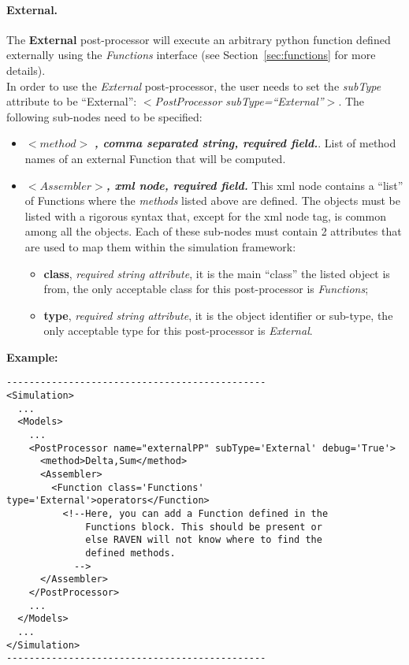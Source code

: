 \paragraph{External.}
\label{External}
The \textbf{External} post-processor will execute an arbitrary python function
defined externally using the \textit{Functions} interface (see 
Section~\ref{sec:functions} for more details).
\\In order to use the \textit{External} post-processor, the user needs to set 
the \textit{subType} attribute to be ``External'': 
\textit{$<$PostProcessor subType=``External''$>$}. 
The following sub-nodes need to be specified:
\begin{itemize}
\item $<method>$ \textbf{\textit{, comma separated string, required field.}}.
List of method names of an external Function that will be computed.
\item $<Assembler>$\textbf{\textit{, xml node, required field.}} This xml node
contains a ``list'' of Functions where the \textit{methods} listed above are
defined. The objects must be listed with a rigorous syntax that, except for the
xml node tag, is common among all the objects. 
Each of these sub-nodes must contain 2 attributes that are used to map them
within the simulation framework:
   \begin{itemize}
     \item \textbf{class}, \textit{required string attribute}, it is the main
           ``class'' the listed object is from, the only acceptable class for
           this post-processor is \textit{Functions};
     \item \textbf{type},  \textit{required string attribute}, it is the object
           identifier or sub-type, the only acceptable type for this 
           post-processor is \textit{External}.
    \end{itemize}
\end{itemize}
\textbf{Example:}
\begin{lstlisting}[style=XML]
----------------------------------------------
<Simulation>
  ...
  <Models>
    ...
    <PostProcessor name="externalPP" subType='External' debug='True'>
      <method>Delta,Sum</method>
      <Assembler>
        <Function class='Functions' type='External'>operators</Function> 
          <!--Here, you can add a Function defined in the
              Functions block. This should be present or
              else RAVEN will not know where to find the
              defined methods.
            -->
      </Assembler>
    </PostProcessor>
    ...
  </Models>
  ...
</Simulation>
----------------------------------------------
\end{lstlisting}
